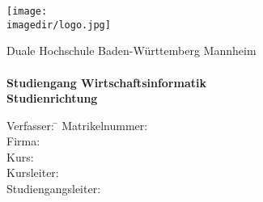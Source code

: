 \begin{titlepage}
\begin{minipage}{\textwidth}
		\vspace{-2cm}
		 \texttt{[image: \\imagedir/logo.jpg]}
\end{minipage}
\vspace{1em}
\begin{center}
	{\textsf{\large Duale Hochschule Baden-W\"urttemberg Mannheim}}\\[4em]
	{\textsf{\textbf{\Large{}\DerTitelDerArbeit}}} \\[1.5cm]
	{\textsf{\textbf{\large{}Studiengang Wirtschaftsinformatik}}\\[6mm]
	\textsf{\textbf{Studienrichtung \DieStudienrichtung}}}\vspace{27em}
	
	\begin{minipage}{\textwidth}
		\begin{tabbing}
		Verfasser: \DerAutorDerArbeit  \hspace{0.85cm}\=\kill
		Matrikelnummer: \> \DieMatrikelnummer \\[1.5mm]
		Firma: \> \DerNameDerFirma  \\[1.5mm]
		Kurs: \> \DieKursbezeichnung \\[1.5mm]
		Kursleiter: \> \DerKursleiter \\[1.5mm]
		Studiengangsleiter: \> \DerStudiengangsleiter
	\end{tabbing}
\end{minipage}


\end{center}
\end{titlepage}